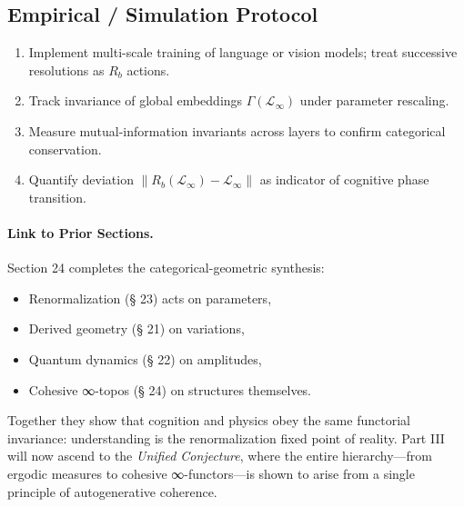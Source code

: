 \documentclass[12pt,a4paper,twoside,openright]{book}
\begin{document}
\subsection*{Empirical / Simulation Protocol}

\begin{enumerate}
\item Implement multi-scale training of language or vision models; treat successive resolutions as \(R_b\) actions.
\item Track invariance of global embeddings $\Gamma(\mathcal{L}_\infty)$ under parameter rescaling.
\item Measure mutual-information invariants across layers to confirm categorical conservation.
\item Quantify deviation $\|R_b(\mathcal{L}_\infty)-\mathcal{L}_\infty\|$ as indicator of cognitive phase transition.
\end{enumerate}

\paragraph{Link to Prior Sections.}
Section 24 completes the categorical-geometric synthesis:
\begin{itemize}
\item Renormalization (§ 23) acts on parameters,
\item Derived geometry (§ 21) on variations,
\item Quantum dynamics (§ 22) on amplitudes,
\item Cohesive ∞-topos (§ 24) on structures themselves.
\end{itemize}
Together they show that cognition and physics obey the same functorial invariance:
understanding is the renormalization fixed point of reality.
Part III will now ascend to the \emph{Unified Conjecture},
where the entire hierarchy—from ergodic measures to cohesive ∞-functors—is shown to arise from a single principle of autogenerative coherence.


\end{document}
